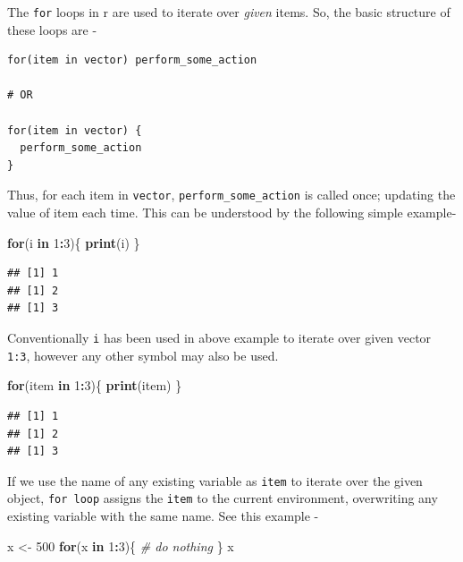 \documentclass[
]{book}
\newenvironment{Shaded}{\begin{snugshade}}{\end{snugshade}}
\newcommand{\CommentTok}[1]{\textcolor[rgb]{0.56,0.35,0.01}{\textit{#1}}}
\newcommand{\ControlFlowTok}[1]{\textcolor[rgb]{0.13,0.29,0.53}{\textbf{#1}}}
\newcommand{\DecValTok}[1]{\textcolor[rgb]{0.00,0.00,0.81}{#1}}
\newcommand{\FunctionTok}[1]{\textcolor[rgb]{0.13,0.29,0.53}{\textbf{#1}}}
\newcommand{\NormalTok}[1]{#1}
\newcommand{\OtherTok}[1]{\textcolor[rgb]{0.56,0.35,0.01}{#1}}
\newcommand{\SpecialCharTok}[1]{\textcolor[rgb]{0.81,0.36,0.00}{\textbf{#1}}}
\begin{document}
The \texttt{for} loops in r are used to iterate over \emph{given} items. So, the basic structure of these loops are -

\begin{verbatim}
for(item in vector) perform_some_action

# OR

for(item in vector) {
  perform_some_action
}
\end{verbatim}

Thus, for each item in \texttt{vector}, \texttt{perform\_some\_action} is called once; updating the value of item each time. This can be understood by the following simple example-

\begin{Shaded}
\begin{Highlighting}[]
\ControlFlowTok{for}\NormalTok{(i }\ControlFlowTok{in} \DecValTok{1}\SpecialCharTok{:}\DecValTok{3}\NormalTok{)\{}
  \FunctionTok{print}\NormalTok{(i)}
\NormalTok{\}}
\end{Highlighting}
\end{Shaded}

\begin{verbatim}
## [1] 1
## [1] 2
## [1] 3
\end{verbatim}

Conventionally \texttt{i} has been used in above example to iterate over given vector \texttt{1:3}, however any other symbol may also be used.

\begin{Shaded}
\begin{Highlighting}[]
\ControlFlowTok{for}\NormalTok{(item }\ControlFlowTok{in} \DecValTok{1}\SpecialCharTok{:}\DecValTok{3}\NormalTok{)\{}
  \FunctionTok{print}\NormalTok{(item)}
\NormalTok{\}}
\end{Highlighting}
\end{Shaded}

\begin{verbatim}
## [1] 1
## [1] 2
## [1] 3
\end{verbatim}

If we use the name of any existing variable as \texttt{item} to iterate over the given object, \texttt{for\ loop} assigns the \texttt{item} to the current environment, overwriting any existing variable with the same name. See this example -

\begin{Shaded}
\begin{Highlighting}[]
\NormalTok{x }\OtherTok{\textless{}{-}} \DecValTok{500}
\ControlFlowTok{for}\NormalTok{(x }\ControlFlowTok{in} \DecValTok{1}\SpecialCharTok{:}\DecValTok{3}\NormalTok{)\{}
  \CommentTok{\# do nothing}
\NormalTok{\}}
\NormalTok{x}
\end{Highlighting}
\end{Shaded}
\end{document}
